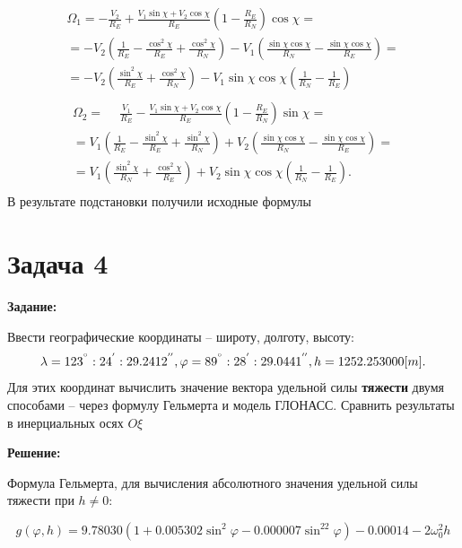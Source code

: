 \documentclass[a4paper,14pt]{article}
\theoremstyle{plain} %
\theoremstyle{definition} %
\theoremstyle{remark} %
\begin{document}
{\begin{eqnarray*}
    \Omega_1 = - \frac{V_2}{R_E} + \frac{V_1 \sin \chi + V_2 \cos \chi}{R_E} \left( 1 - \frac{R_E}{R_N}\right) \cos \chi=\\
    = -V_2\left(\frac{1}{R_E}-\frac{\cos^2\chi}{R_E}+\frac{\cos^2\chi}{R_N}\right)-V_1\left( \frac{\sin\chi\cos\chi}{R_N}-\frac{\sin\chi\cos\chi}{R_E} \right) =\\
    = -V_2\left(\frac{\sin^2\chi}{R_E}+\frac{\cos^2\chi}{R_N}\right)-V_1\sin\chi\cos\chi\left( \frac{1}{R_N}-\frac{1}{R_E} \right)\\
\end{eqnarray*}
\begin{eqnarray*}
    \Omega_2 = \phantom{-} \frac{V_1}{R_E} - \frac{V_1 \sin \chi + V_2 \cos \chi}{R_E} \left( 1- \frac{R_E}{R_N}\right) \sin \chi=\\
    =V_1\left(\frac{1}{R_E}-\frac{\sin^2\chi}{R_E}+\frac{\sin^2\chi}{R_N}\right)+V_2\left( \frac{\sin\chi\cos\chi}{R_N}-\frac{\sin\chi\cos\chi}{R_E} \right) =\\
    =V_{1}\left(\frac{\sin^{2}\chi}{R_{N}} +\frac{\cos^{2}\chi}{R_{E}}\right ) + V_{2} \sin \chi \cos \chi\left(\frac{1}{R_{N}} - \frac{1}{R_{E}}\right).\\
\end{eqnarray*}
В результате подстановки получили исходные формулы
\section{Задача 4}
\textbf{Задание:}

Ввести географические координаты -- широту, долготу, высоту:
\[
    \lambda=123^{\degree}:24^{'}:29.2412^{''}, \varphi=89^{\degree}:28^{'}:29.0441^{''}, h=1252.253000[m].
\]
Для этих координат вычислить значение вектора удельной силы
\textbf{тяжести} двумя способами -- через формулу Гельмерта и модель ГЛОНАСС.
Сравнить результаты в инерциальных осях $O\xi$

\textbf{Решение:}

Формула Гельмерта, для вычисления абсолютного значения удельной силы тяжести при $h\neq0$:

\[
    g(\varphi,h)=9.78030(1+0.005302\sin^2\varphi-0.000007\sin^22\varphi)-0.00014-2\omega^2_0h
\]

}
\end{document}
